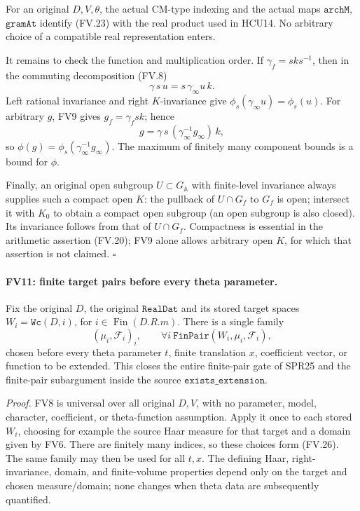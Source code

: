 For an original \(D,V,\theta\), the actual CM-type indexing and
the actual maps \(\texttt{archM}\), \(\texttt{gramAt}\) identify
(FV.23) with the real product used in HCU14.  No arbitrary choice
of a compatible real representation enters.

It remains to check the function and multiplication order.
If \(\gamma_f=sks^{-1}\), then in the commuting decomposition
(FV.8)
\[
                     \gamma\,s\,u=s\,\gamma_\infty u\,k.
 \tag{FV.24}
\]
Left rational invariance and right \(K\)-invariance give
\(\phi_s(\gamma_\infty u)=\phi_s(u)\).
For arbitrary \(g\), FV9 gives \(g_f=\gamma_fsk\); hence
\[
           g=\gamma\,s\,(\gamma_\infty^{-1}g_\infty)\,k,
 \tag{FV.25}
\]
so \(\phi(g)=\phi_s(\gamma_\infty^{-1}g_\infty)\).
The maximum of finitely many component bounds is a bound
for \(\phi\).

Finally, an original open subgroup \(U\subset G_{\mathbb A}\)
with finite-level invariance always supplies such a compact
open \(K\): the pullback of \(U\cap G_f\) to \(G_f\) is open;
intersect it with \(K_0\) to obtain a compact open subgroup
(an open subgroup is also closed).  Its invariance follows
from that of \(U\cap G_f\).  Compactness is essential in the
arithmetic assertion (FV.20); FV9 alone allows arbitrary
open \(K\), for which that assertion is not claimed. \(\square\)

\paragraph{FV11: finite target pairs before every theta parameter.}
\label{claim:FV11}
Fix the original \(D\), the original \(\texttt{RealDat}\) and its
stored target spaces \(W_i=\texttt{Wc}(D,i)\), for
\(i\in\operatorname{Fin}(D.R.m)\).  There is a single family
\[
       (\mu_i,\mathcal F_i)_i,\qquad
       \forall i\ \texttt{FinPair}(W_i,\mu_i,\mathcal F_i),
 \tag{FV.26}
\]
chosen before every theta parameter \(t\), finite translation \(x\),
coefficient vector, or function to be extended.  This closes the
entire finite-pair gate of SPR25 and the finite-pair subargument
inside the source \(\texttt{exists\_extension}\).

\emph{Proof.}
FV8 is universal over all original \(D,V\), with no parameter,
model, character, coefficient, or theta-function assumption.
Apply it once to each stored \(W_i\), choosing for example the
source Haar measure for that target and a domain given by FV6.
There are finitely many indices, so these choices form (FV.26).
The same family may then be used for all \(t,x\).  The defining
Haar, right-invariance, domain, and finite-volume properties
depend only on the target and chosen measure/domain; none changes
when theta data are subsequently quantified.

